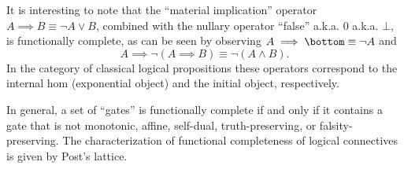 \documentclass{article}
\begin{document}
It is interesting to note that the ``material implication'' operator
$A \implies B \equiv \neg A \lor B$, combined with the nullary
operator ``false'' a.k.a. $0$ a.k.a. $\bot$, is functionally
complete, as can be seen by observing
$A \implies \bottom \equiv \neg A$ and
$$
A \implies \neg (A \implies B)
\equiv
\neg (A \land B).
$$
In the category of classical logical propositions these operators
correspond to the internal hom (exponential object) and the initial
object, respectively.

In general, a set of ``gates'' is functionally complete if
and only if it contains a gate that is not monotonic, affine,
self-dual, truth-preserving, or falsity-preserving. The
characterization of functional completeness of logical connectives is
given by Post's lattice.
\end{document}
